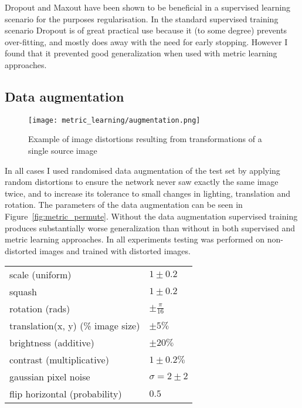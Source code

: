 Dropout and Maxout have been shown to be beneficial in a supervised learning scenario for the purposes regularisation. In the standard supervised training scenario Dropout is of great practical use because it (to some degree) prevents over-fitting, and mostly does away with the need for early stopping. However I found that it prevented good generalization when used with metric learning approaches.

\subsection {Data augmentation}

\begin{figure}[h]
\centering
\texttt{[image: metric\_learning/augmentation.png]}
\caption{Example of image distortions resulting from transformations of a single source image}
\label{fig:metric_augmentation}
\end{figure}


In all cases I used randomised data augmentation of the test set by applying random distortions to ensure the network never saw exactly the same image twice, and to increase its tolerance to small changes in lighting, translation and rotation. The parameters of the data augmentation can be seen in Figure~\ref{fig:metric_permute}. Without the data augmentation supervised training produces substantially worse generalization than without in both supervised and metric learning approaches. In all experiments testing was performed on non-distorted images and trained with distorted images.

\begin{table*}
  \centering
    \caption{Ranges of parameters used for image distortion }

  \begin{tabular}{ l  l }
    \toprule
    scale (uniform) & $ 1 \pm 0.2 $  \\ 
    squash  & $ 1 \pm 0.2 $  \\ 
    rotation (rads) & $ \pm \frac{\pi}{16} $ \\ 
    translation(x, y) (\% image size) & $ \pm 5 \% $ \\ 
    brightness (additive) & $ \pm 20 \% $ \\ 
    contrast (multiplicative) & $ 1 \pm 0.2 \% $ \\ 
    gaussian pixel noise & $ \sigma = 2 \pm 2 $  \\ 
    flip horizontal (probability) & $ 0.5 $ \\ 
    \bottomrule
  \end{tabular}
\label{fig:metric_permute}
\end{table*}

